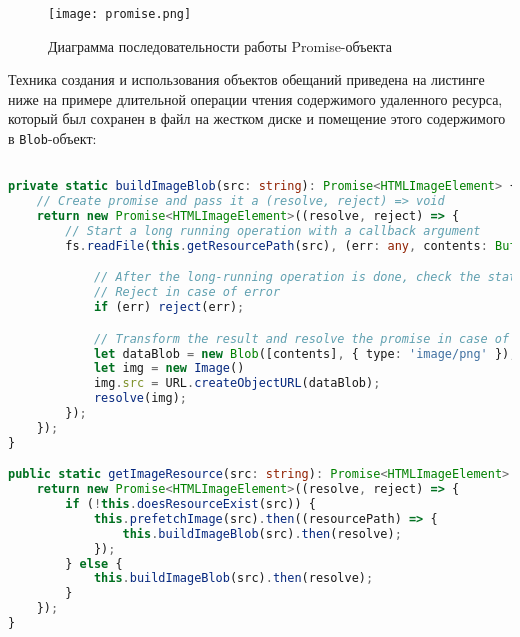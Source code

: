 \begin{figure}[ht]
\centering
  \texttt{[image: promise.png]}
  \caption{Диаграмма последовательности работы Promise-объекта}
  \label{fig:theory:promise}
\end{figure}

Техника создания и использования объектов обещаний приведена на листинге ниже на примере длительной операции чтения содержимого удаленного ресурса, который был сохранен в
файл на жестком диске и помещение этого содержимого в \texttt{Blob}-объект:
\begin{lstlisting}[language=TypeScript, showstringspaces=false, label=lst:dev:framelements4]

private static buildImageBlob(src: string): Promise<HTMLImageElement> {
    // Create promise and pass it a (resolve, reject) => void
    return new Promise<HTMLImageElement>((resolve, reject) => {
        // Start a long running operation with a callback argument
        fs.readFile(this.getResourcePath(src), (err: any, contents: Buffer) => {

            // After the long-running operation is done, check the status.
            // Reject in case of error
            if (err) reject(err);

            // Transform the result and resolve the promise in case of success.
            let dataBlob = new Blob([contents], { type: 'image/png' });
            let img = new Image()
            img.src = URL.createObjectURL(dataBlob);
            resolve(img);
        });
    });
}

public static getImageResource(src: string): Promise<HTMLImageElement> {
    return new Promise<HTMLImageElement>((resolve, reject) => {
        if (!this.doesResourceExist(src)) {
            this.prefetchImage(src).then((resourcePath) => {
                this.buildImageBlob(src).then(resolve);
            });
        } else {
            this.buildImageBlob(src).then(resolve);
        }
    });
}
\end{lstlisting}

